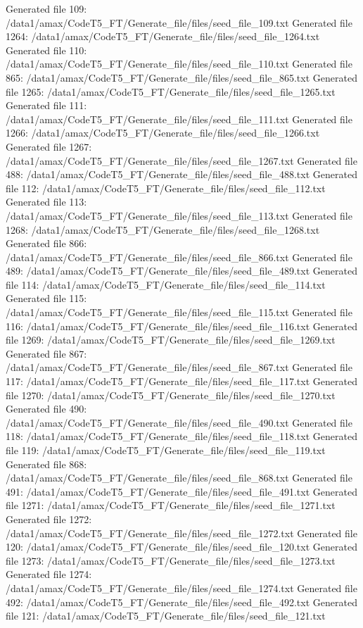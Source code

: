 Generated file 109: /data1/amax/CodeT5_FT/Generate_file/files/seed_file_109.txt
Generated file 1264: /data1/amax/CodeT5_FT/Generate_file/files/seed_file_1264.txt
Generated file 110: /data1/amax/CodeT5_FT/Generate_file/files/seed_file_110.txt
Generated file 865: /data1/amax/CodeT5_FT/Generate_file/files/seed_file_865.txt
Generated file 1265: /data1/amax/CodeT5_FT/Generate_file/files/seed_file_1265.txt
Generated file 111: /data1/amax/CodeT5_FT/Generate_file/files/seed_file_111.txt
Generated file 1266: /data1/amax/CodeT5_FT/Generate_file/files/seed_file_1266.txt
Generated file 1267: /data1/amax/CodeT5_FT/Generate_file/files/seed_file_1267.txt
Generated file 488: /data1/amax/CodeT5_FT/Generate_file/files/seed_file_488.txt
Generated file 112: /data1/amax/CodeT5_FT/Generate_file/files/seed_file_112.txt
Generated file 113: /data1/amax/CodeT5_FT/Generate_file/files/seed_file_113.txt
Generated file 1268: /data1/amax/CodeT5_FT/Generate_file/files/seed_file_1268.txt
Generated file 866: /data1/amax/CodeT5_FT/Generate_file/files/seed_file_866.txt
Generated file 489: /data1/amax/CodeT5_FT/Generate_file/files/seed_file_489.txt
Generated file 114: /data1/amax/CodeT5_FT/Generate_file/files/seed_file_114.txt
Generated file 115: /data1/amax/CodeT5_FT/Generate_file/files/seed_file_115.txt
Generated file 116: /data1/amax/CodeT5_FT/Generate_file/files/seed_file_116.txt
Generated file 1269: /data1/amax/CodeT5_FT/Generate_file/files/seed_file_1269.txt
Generated file 867: /data1/amax/CodeT5_FT/Generate_file/files/seed_file_867.txt
Generated file 117: /data1/amax/CodeT5_FT/Generate_file/files/seed_file_117.txt
Generated file 1270: /data1/amax/CodeT5_FT/Generate_file/files/seed_file_1270.txt
Generated file 490: /data1/amax/CodeT5_FT/Generate_file/files/seed_file_490.txt
Generated file 118: /data1/amax/CodeT5_FT/Generate_file/files/seed_file_118.txt
Generated file 119: /data1/amax/CodeT5_FT/Generate_file/files/seed_file_119.txt
Generated file 868: /data1/amax/CodeT5_FT/Generate_file/files/seed_file_868.txt
Generated file 491: /data1/amax/CodeT5_FT/Generate_file/files/seed_file_491.txt
Generated file 1271: /data1/amax/CodeT5_FT/Generate_file/files/seed_file_1271.txt
Generated file 1272: /data1/amax/CodeT5_FT/Generate_file/files/seed_file_1272.txt
Generated file 120: /data1/amax/CodeT5_FT/Generate_file/files/seed_file_120.txt
Generated file 1273: /data1/amax/CodeT5_FT/Generate_file/files/seed_file_1273.txt
Generated file 1274: /data1/amax/CodeT5_FT/Generate_file/files/seed_file_1274.txt
Generated file 492: /data1/amax/CodeT5_FT/Generate_file/files/seed_file_492.txt
Generated file 121: /data1/amax/CodeT5_FT/Generate_file/files/seed_file_121.txt
